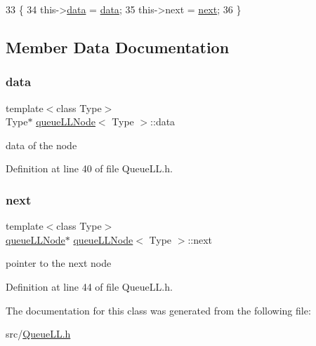 \begin{DoxyCode}
33                                                   \{
34         this->\hyperlink{classqueue_l_l_node_a20b1170d8c5852b7dc01e56fda4e4206}{data} = \hyperlink{classqueue_l_l_node_a20b1170d8c5852b7dc01e56fda4e4206}{data};
35         this->next = \hyperlink{classqueue_l_l_node_ab8367d61c51828d9f21d72537b62735f}{next};
36     \}
\end{DoxyCode}


\subsection{Member Data Documentation}
\mbox{\label{classqueue_l_l_node_a20b1170d8c5852b7dc01e56fda4e4206}} 
\subsubsection{\texorpdfstring{data}{data}}
{\footnotesize\ttfamily template$<$class Type$>$ \\
Type$\ast$ \hyperlink{classqueue_l_l_node}{queue\+L\+L\+Node}$<$ Type $>$\+::data}

data of the node 

Definition at line 40 of file Queue\+L\+L.\+h.

\mbox{\label{classqueue_l_l_node_ab8367d61c51828d9f21d72537b62735f}} 
\subsubsection{\texorpdfstring{next}{next}}
{\footnotesize\ttfamily template$<$class Type$>$ \\
\hyperlink{classqueue_l_l_node}{queue\+L\+L\+Node}$\ast$ \hyperlink{classqueue_l_l_node}{queue\+L\+L\+Node}$<$ Type $>$\+::next}

pointer to the next node 

Definition at line 44 of file Queue\+L\+L.\+h.



The documentation for this class was generated from the following file\+:\begin{DoxyCompactItemize}
\item 
src/\hyperlink{_queue_l_l_8h}{Queue\+L\+L.\+h}\end{DoxyCompactItemize}
